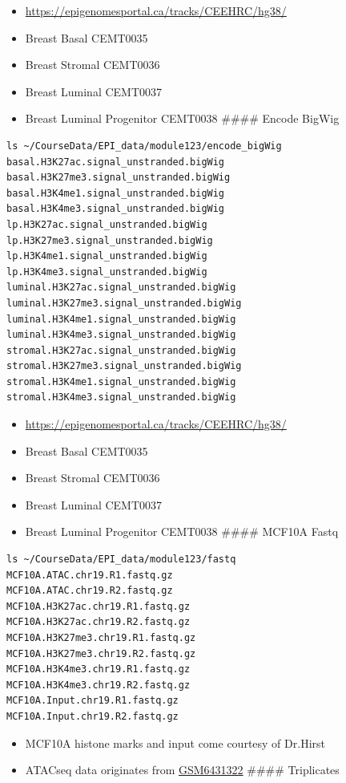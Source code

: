 \documentclass[
]{book}
\providecommand{\tightlist}{%
  \setlength{\itemsep}{0pt}\setlength{\parskip}{0pt}}
\begin{document}
\begin{itemize}
\tightlist
\item
  \url{https://epigenomesportal.ca/tracks/CEEHRC/hg38/}
\item
  Breast Basal CEMT0035
\item
  Breast Stromal CEMT0036
\item
  Breast Luminal CEMT0037
\item
  Breast Luminal Progenitor CEMT0038
  \#\#\#\# Encode BigWig
\end{itemize}

\begin{verbatim}
ls ~/CourseData/EPI_data/module123/encode_bigWig
basal.H3K27ac.signal_unstranded.bigWig
basal.H3K27me3.signal_unstranded.bigWig
basal.H3K4me1.signal_unstranded.bigWig
basal.H3K4me3.signal_unstranded.bigWig
lp.H3K27ac.signal_unstranded.bigWig
lp.H3K27me3.signal_unstranded.bigWig
lp.H3K4me1.signal_unstranded.bigWig
lp.H3K4me3.signal_unstranded.bigWig
luminal.H3K27ac.signal_unstranded.bigWig
luminal.H3K27me3.signal_unstranded.bigWig
luminal.H3K4me1.signal_unstranded.bigWig
luminal.H3K4me3.signal_unstranded.bigWig
stromal.H3K27ac.signal_unstranded.bigWig
stromal.H3K27me3.signal_unstranded.bigWig
stromal.H3K4me1.signal_unstranded.bigWig
stromal.H3K4me3.signal_unstranded.bigWig
\end{verbatim}

\begin{itemize}
\tightlist
\item
  \url{https://epigenomesportal.ca/tracks/CEEHRC/hg38/}
\item
  Breast Basal CEMT0035
\item
  Breast Stromal CEMT0036
\item
  Breast Luminal CEMT0037
\item
  Breast Luminal Progenitor CEMT0038
  \#\#\#\# MCF10A Fastq
\end{itemize}

\begin{verbatim}
ls ~/CourseData/EPI_data/module123/fastq
MCF10A.ATAC.chr19.R1.fastq.gz
MCF10A.ATAC.chr19.R2.fastq.gz
MCF10A.H3K27ac.chr19.R1.fastq.gz
MCF10A.H3K27ac.chr19.R2.fastq.gz
MCF10A.H3K27me3.chr19.R1.fastq.gz
MCF10A.H3K27me3.chr19.R2.fastq.gz
MCF10A.H3K4me3.chr19.R1.fastq.gz
MCF10A.H3K4me3.chr19.R2.fastq.gz
MCF10A.Input.chr19.R1.fastq.gz
MCF10A.Input.chr19.R2.fastq.gz
\end{verbatim}

\begin{itemize}
\tightlist
\item
  MCF10A histone marks and input come courtesy of Dr.Hirst
\item
  ATACseq data originates from \href{https://www.ncbi.nlm.nih.gov/geo/query/acc.cgi?acc=GSM6431322}{GSM6431322}
  \#\#\#\# Triplicates
\end{itemize}
\end{document}
